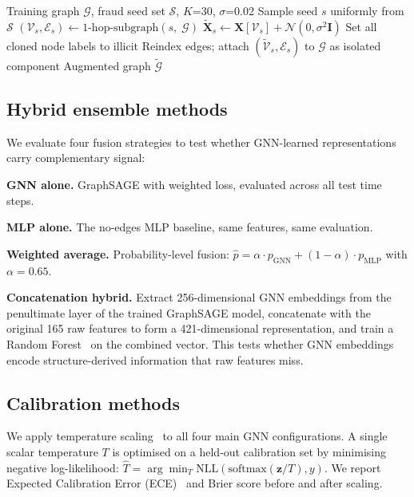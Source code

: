 \begin{algorithm}[!htbp]
\caption{Structural graph augmentation}
\label{alg:aug}
\begin{algorithmic}[1]
\REQUIRE Training graph $\mathcal{G}$, fraud seed set $\mathcal{S}$,
  $K$=30, $\sigma$=0.02
  \STATE Sample seed $s$ uniformly from $\mathcal{S}$
  \STATE $(\mathcal{V}_s, \mathcal{E}_s) \leftarrow
    \text{1-hop-subgraph}(s,\;\mathcal{G})$
  \STATE $\tilde{\mathbf{X}}_s \leftarrow \mathbf{X}[\mathcal{V}_s]
    + \mathcal{N}(0,\sigma^2\mathbf{I})$
  \STATE Set all cloned node labels to illicit
  \STATE Reindex edges; attach $(\tilde{\mathcal{V}}_s, \mathcal{E}_s)$
    to $\mathcal{G}$ as isolated component
\ENDFOR
\RETURN Augmented graph $\tilde{\mathcal{G}}$
\end{algorithmic}
\end{algorithm}

\subsection{Hybrid ensemble methods}
\label{sec:hybrid_methods}

We evaluate four fusion strategies to test whether GNN-learned
representations carry complementary signal:

\textbf{GNN alone.}  GraphSAGE with weighted loss, evaluated across
all test time steps.

\textbf{MLP alone.}  The no-edges MLP baseline, same features, same
evaluation.

\textbf{Weighted average.}  Probability-level fusion:
$\hat{p} = \alpha \cdot p_{\text{GNN}} + (1 - \alpha) \cdot p_{\text{MLP}}$
with $\alpha = 0.65$.

\textbf{Concatenation hybrid.}  Extract 256-dimensional GNN embeddings
from the penultimate layer of the trained GraphSAGE model, concatenate
with the original 165 raw features to form a 421-dimensional
representation, and train a Random Forest~\citep{breiman2001rf} on
the combined vector.  This tests whether GNN embeddings encode
structure-derived information that raw features miss.

\subsection{Calibration methods}
\label{sec:calibration_methods}

We apply temperature scaling~\citep{guo2017calibration} to all four
main GNN configurations.  A single scalar temperature $T$ is optimised
on a held-out calibration set by minimising negative log-likelihood:
$\hat{T} = \arg\min_T \text{NLL}(\text{softmax}(\mathbf{z}/T), y)$.
We report Expected Calibration Error
(ECE)~\citep{naeini2015calibration} and Brier score before and after
scaling.


